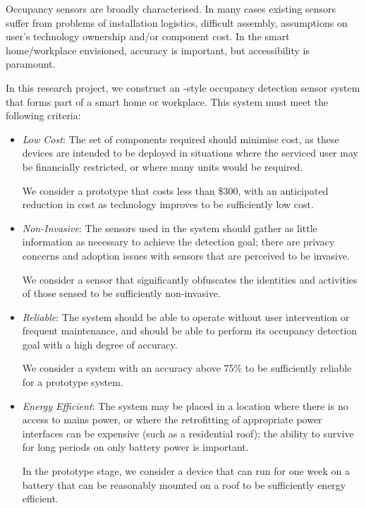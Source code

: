 \documentclass[../thesis/thesis.tex]{subfiles}
\begin{document}
Occupancy sensors are broadly characterised. In many cases existing sensors suffer from problems of installation logistics, difficult assembly, assumptions on user's technology ownership and/or component cost. In the smart home/workplace envisioned, accuracy is important, but accessibility is paramount.

In this research project, we construct an \iot-style occupancy detection sensor system that forms part of a smart home or workplace. This system must meet the following criteria:

\begin{itemize}
 \item \emph{Low Cost}: The set of components required should minimise cost, as these devices are intended to be deployed in situations where the serviced user may be financially restricted, or where many units would be required.

 We consider a prototype that costs less than \$300, with an anticipated reduction in cost as technology improves to be sufficiently low cost.
  
 \item \emph{Non-Invasive}: The sensors used in the system should gather as little information as necessary to achieve the detection goal; there are privacy concerns and adoption issues with sensors that are perceived to be invasive.

 We consider a sensor that significantly obfuscates the identities and activities of those sensed to be sufficiently non-invasive.
 
 \item \emph{Reliable}: The system should be able to operate without user intervention or frequent maintenance, and should be able to perform its occupancy detection goal with a high degree of accuracy.

 We consider a system with an accuracy above 75\% to be sufficiently reliable for a prototype system.
 
 \item \emph{Energy Efficient}: The system may be placed in a location where there is no access to mains power, or where the retrofitting of appropriate power interfaces can be expensive (such as a residential roof); the ability to survive for long periods on only battery power is important.

 In the prototype stage, we consider a device that can run for one week on a battery that can be reasonably mounted on a roof to be sufficiently energy efficient.
\end{itemize}
\end{document}
